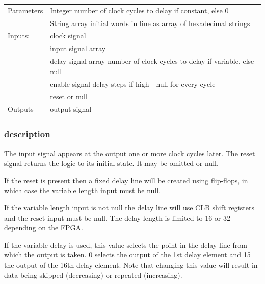 \documentclass[10pt,a4paper,twoside,fleqn]{book}
\begin{document}
                    \begin{tabular}{| l | l |}
                    \hline
                    Parameters  & Integer number of clock cycles to delay if constant,
                                  else 0 \\
                                & String array  initial words in line as array of hexadecimal strings \\
                    \hline
                    Inputs:     & clock signal \\
                                & input signal array \\
                                & delay signal array  number of clock cycles to delay if
                                  variable, else null \\
                                & enable signal delay steps if high - null for
                                  every cycle \\
                                & reset or null \\
                    \hline
                    Outputs     & output signal \\
                    \hline
                    \end{tabular}

                \subsubsection{description}

                The input signal appears at the output one or more clock cycles
                later. The reset signal returns the logic to its initial
                state. It may be omitted or null.
                
                If the reset is present then a fixed delay line will be created
                using flip-flops, in which case the variable length input must
                be null.
                
                If the variable length input is not null the delay line will
                use CLB shift registers and the reset input must be null.
                The delay length is limited to 16 or 32 depending on the
                FPGA.
            
                If the variable delay is used, this value selects the point
                in the delay line from which the output is taken. 0 selects
                the output of the 1st delay element and 15 the output of the
                16th delay element. Note that changing this value will result
                in data being skipped (decreasing) or repeated (increasing).
\end{document}
